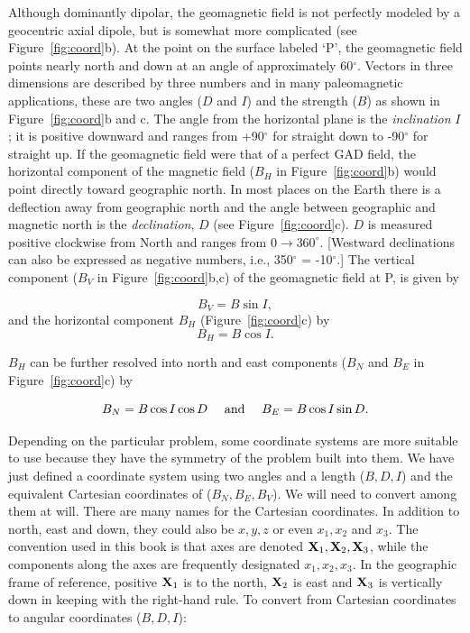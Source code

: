 Although dominantly dipolar, the  geomagnetic field is not perfectly modeled by a geocentric axial dipole, but is somewhat more complicated (see Figure~\ref{fig:coord}b).  At the point on the surface labeled `P', the geomagnetic field points nearly north and down at an angle of approximately 60$^{\circ}$.   
Vectors in three dimensions are described by three numbers and in many paleomagnetic applications, these are two angles ($D$ and $I$) and the  strength ($B$)  as shown in  Figure~\ref{fig:coord}b and c.  The angle from the horizontal plane  is  the
%
 {\it inclination} $I$; it  is positive downward and ranges from +90$^{\circ}$ for straight down to -90$^{\circ}$ for straight up.   If the geomagnetic field were that of a perfect GAD field, the horizontal component of the magnetic field ($B_H$ in Figure~\ref{fig:coord}b)  would point directly toward geographic  north.  In most places on the Earth there is a deflection away from geographic north and  the angle between geographic and magnetic north is the
%
 {\it declination}, $D$ (see Figure~\ref{fig:coord}c).  $D$ is measured positive clockwise from  North  and  ranges from $0 \rightarrow 360^\circ$.   [Westward declinations can also be expressed as negative numbers, i.e., 350$^{\circ}$ = -10$^{\circ}$.]   The vertical component ($B_V$  in Figure~\ref{fig:coord}b,c) of the geomagnetic field at P, is given by 

\begin{equation}
B_V = B \sin I,
\label{eq:Bv}
\end{equation}   
\noindent and the horizontal component $B_H$  (Figure~\ref{fig:coord}c) by
\begin{equation}
B_H = B \cos I.
\label{eq:Bh}
\end{equation}  

\noindent    $B_H$
can  be  further resolved into north and east components ($B_N$ and $B_E$ in Figure~\ref{fig:coord}c) by


\begin{equation}
 B_N=B \cos I \cos D \hskip 1em \hbox{ and } \hskip 1em B_E=B \cos I \sin D .
\label{eq:BnBe}
\end{equation}





Depending on
the particular problem, some 
%
coordinate systems are more suitable to
use because they have the symmetry of the problem built into them.    We have just defined a coordinate system using two angles and a length ($B,D,I$) and the equivalent 
%
Cartesian coordinates of  ($B_N, B_E, B_V$). We
will need to convert among them at will.  There are many names for the Cartesian coordinates. In addition to north, east and down, they  could also be $x,y,z$ or even
 $x_1, x_2$ and $x_3$. 
The convention used in
this book is that axes are denoted $\hbox{\bf X}_1, \hbox{\bf X}_2, \hbox{\bf X}_3$, while the components
along the axes are frequently designated $x_1, x_2, x_3$.  In the geographic frame of reference,
positive $\hbox{\bf X}_1$ is to the north, $\hbox{\bf X}_2$ is east and $\hbox{\bf X}_3$ is vertically 
down in keeping with the right-hand rule.    To convert from  Cartesian coordinates to angular coordinates ($B,D,I$):

